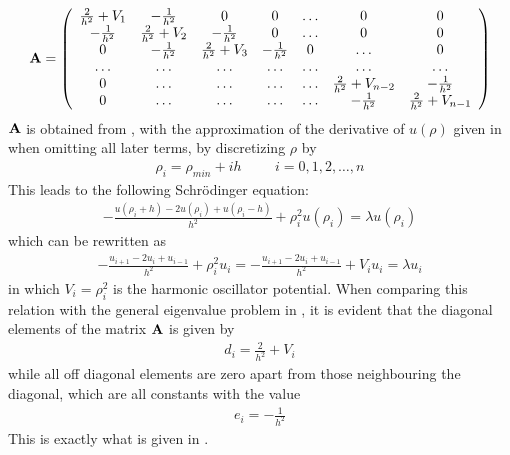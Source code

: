 \begin{align}
	\mbox{\textbf{A}} = 
	\left( \begin{array}{ccccccc} \frac{2}{h^2}+V_1 & -\frac{1}{h^2} & 0   & 0    & \dots  &0     & 0 \\
                                -\frac{1}{h^2} & \frac{2}{h^2}+V_2 & -\frac{1}{h^2} & 0    & \dots  &0     &0 \\
                                0   & -\frac{1}{h^2} & \frac{2}{h^2}+V_3 & -\frac{1}{h^2}  &0       &\dots & 0\\
                                \dots  & \dots & \dots & \dots  &\dots      &\dots & \dots\\
                                0   & \dots & \dots & \dots  &\dots       &\frac{2}{h^2}+V_{n-2} & -\frac{1}{h^2}\\
                                0   & \dots & \dots & \dots  &\dots       &-\frac{1}{h^2} & \frac{2}{h^2}+V_{n-1}
             \end{array} \right) 
	\label{eq:NatureOfTheProblem6}
\end{align}
$\mbox{\textbf{A}}$ is obtained from , with the approximation of the derivative of $u(\rho)$ given in  when omitting all later terms, by discretizing $\rho$ by
\begin{align}
	\rho_i= \rho_{{min}} + ih \hspace{1cm} i=0,1,2,\dots , n
	\label{eq:NatureOfTheProblem7}
\end{align}
This leads to the following Schr\"{o}dinger equation:
\begin{align}
	-\frac{u(\rho_i+h) -2u(\rho_i) +u(\rho_i-h)}{h^2}+\rho_i^2u(\rho_i)  = \lambda u(\rho_i)
	\label{eq:NatureOfTheProblem8}
\end{align}
which can be rewritten as
\begin{align}
	-\frac{u_{i+1} -2u_i +u_{i-1}}{h^2}+\rho_i^2u_i=-\frac{u_{i+1} -2u_i +u_{i-1} }{h^2}+V_iu_i  = \lambda u_i
	\label{eq:NatureOfTheProblem9}
\end{align}
in which $V_i = \rho_i^2$ is the harmonic oscillator potential.
When comparing this relation with the general eigenvalue problem in , it is evident that the diagonal elements of the matrix $\mbox{\textbf{A}}$ is given by
\begin{align}
	d_i=\frac{2}{h^2}+V_i
	\label{eq:NatureOfTheProblem10}
\end{align} 
while all off diagonal elements are zero apart from those neighbouring the diagonal, which are all constants with the value
\begin{align}
	e_i=-\frac{1}{h^2}
	\label{eq:NatureOfTheProblem11}
\end{align}
This is exactly what is given in . 

